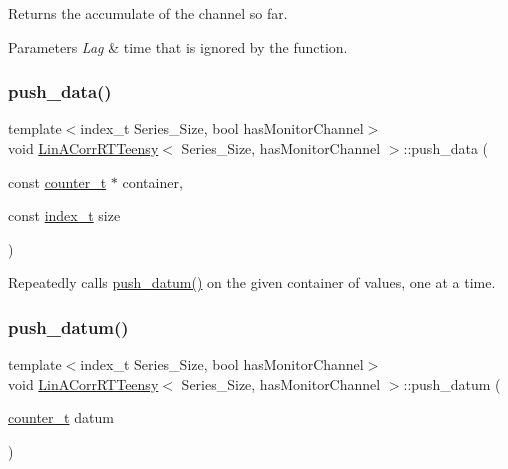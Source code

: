 Returns the accumulate of the channel so far. 


\begin{DoxyParams}{Parameters}
{\em Lag} & time that is ignored by the function. \\
\hline
\end{DoxyParams}
\mbox{\label{classLinACorrRTTeensy_abf6a40dff92088469fbb8ceabf9da799}} 
\subsubsection{\texorpdfstring{push\+\_\+data()}{push\_data()}}
{\footnotesize\ttfamily template$<$index\+\_\+t Series\+\_\+\+Size, bool has\+Monitor\+Channel$>$ \\
void \hyperlink{classLinACorrRTTeensy}{Lin\+A\+Corr\+R\+T\+Teensy}$<$ Series\+\_\+\+Size, has\+Monitor\+Channel $>$\+::push\+\_\+data (\begin{DoxyParamCaption}\item[{const \hyperlink{types_8hpp_a22f279793847eba127de149437848c48}{counter\+\_\+t} $\ast$}]{container,  }\item[{const \hyperlink{types_8hpp_ab41b824af8e088d090c0b9e60f536c9d}{index\+\_\+t}}]{size }\end{DoxyParamCaption})\hspace{0.3cm}{\ttfamily [inline]}}



Repeatedly calls {\ttfamily \hyperlink{classLinACorrRTTeensy_aacc634aad2252efbb6ee3a4c2ac422dc}{push\+\_\+datum()}} on the given container of values, one at a time. 

\mbox{\label{classLinACorrRTTeensy_aacc634aad2252efbb6ee3a4c2ac422dc}} 
\subsubsection{\texorpdfstring{push\+\_\+datum()}{push\_datum()}}
{\footnotesize\ttfamily template$<$index\+\_\+t Series\+\_\+\+Size, bool has\+Monitor\+Channel$>$ \\
void \hyperlink{classLinACorrRTTeensy}{Lin\+A\+Corr\+R\+T\+Teensy}$<$ Series\+\_\+\+Size, has\+Monitor\+Channel $>$\+::push\+\_\+datum (\begin{DoxyParamCaption}\item[{\hyperlink{types_8hpp_a22f279793847eba127de149437848c48}{counter\+\_\+t}}]{datum }\end{DoxyParamCaption})\hspace{0.3cm}{\ttfamily [inline]}}



